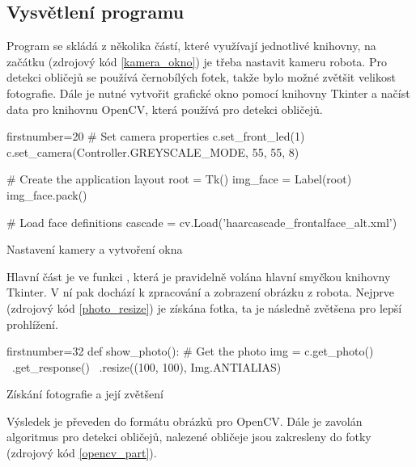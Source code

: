 \subsection{Vysvětlení programu}

Program se skládá z několika částí, které využívají jednotlivé knihovny, na
začátku (zdrojový kód \ref{kamera_okno}) je třeba nastavit kameru robota. Pro
detekci obličejů se používá černobílých fotek, takže bylo možné zvětšit
velikost fotografie. Dále je nutné vytvořit grafické okno pomocí knihovny
Tkinter a načíst data pro knihovnu OpenCV, která používá pro detekci obličejů.

\begin{listing}
\begin{pyc*}{firstnumber=20}
# Set camera properties
c.set_front_led(1)
c.set_camera(Controller.GREYSCALE_MODE, 55, 55, 8)

# Create the application layout
root = Tk()
img_face = Label(root)
img_face.pack()

# Load face definitions
cascade = cv.Load('haarcascade_frontalface_alt.xml')
\end{pyc*}
\caption{Nastavení kamery a vytvoření okna}
\label{kamera_okno}
\end{listing}

Hlavní část je ve funkci , která je pravidelně volána hlavní
smyčkou knihovny Tkinter. V ní pak dochází k zpracování a zobrazení obrázku z
robota. Nejprve (zdrojový kód \ref{photo_resize}) je získána fotka, ta je
následně zvětšena pro lepší prohlížení.

\begin{listing}
\begin{pyc*}{firstnumber=32}
def show_photo():
    # Get the photo
    img = c.get_photo() \
        .get_response() \
        .resize((100, 100), Img.ANTIALIAS)
\end{pyc*}
\caption{Získání fotografie a její zvětšení}
\label{photo_resize}
\end{listing}

Výsledek je převeden do formátu obrázků pro OpenCV. Dále je zavolán algoritmus
pro detekci obličejů, nalezené obličeje jsou zakresleny do fotky (zdrojový kód
\ref{opencv_part}).

